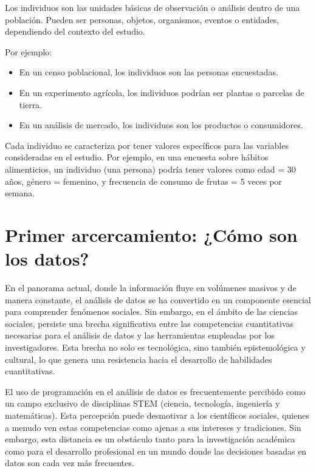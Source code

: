 \documentclass[
  letterpaper,
  DIV=11,
  numbers=noendperiod]{scrreprt}
\providecommand{\tightlist}{%
  \setlength{\itemsep}{0pt}\setlength{\parskip}{0pt}}\usepackage{longtable,booktabs,array}
\begin{document}
Los individuos son las unidades básicas de observación o análisis dentro
de una población. Pueden ser personas, objetos, organismos, eventos o
entidades, dependiendo del contexto del estudio.

Por ejemplo:

\begin{itemize}
\tightlist
\item
  En un censo poblacional, los individuos son las personas
  encuestadas.\\
\item
  En un experimento agrícola, los individuos podrían ser plantas o
  parcelas de tierra.\\
\item
  En un análisis de mercado, los individuos son los productos o
  consumidores.
\end{itemize}

Cada individuo se caracteriza por tener valores específicos para las
variables consideradas en el estudio. Por ejemplo, en una encuesta sobre
hábitos alimenticios, un individuo (una persona) podría tener valores
como edad = 30 años, género = femenino, y frecuencia de consumo de
frutas = 5 veces por semana.

\section{Primer arcercamiento: ¿Cómo son los
datos?}\label{primer-arcercamiento-cuxf3mo-son-los-datos}

En el panorama actual, donde la información fluye en volúmenes masivos y
de manera constante, el análisis de datos se ha convertido en un
componente esencial para comprender fenómenos sociales. Sin embargo, en
el ámbito de las ciencias sociales, persiste una brecha significativa
entre las competencias cuantitativas necesarias para el análisis de
datos y las herramientas empleadas por los investigadores. Esta brecha
no solo es tecnológica, sino también epistemológica y cultural, lo que
genera una resistencia hacia el desarrollo de habilidades cuantitativas.

El uso de programación en el análisis de datos es frecuentemente
percibido como un campo exclusivo de disciplinas STEM (ciencia,
tecnología, ingeniería y matemáticas). Esta percepción puede desmotivar
a los científicos sociales, quienes a menudo ven estas competencias como
ajenas a sus intereses y tradiciones. Sin embargo, esta distancia es un
obstáculo tanto para la investigación académica como para el desarrollo
profesional en un mundo donde las decisiones basadas en datos son cada
vez más frecuentes.
\end{document}
